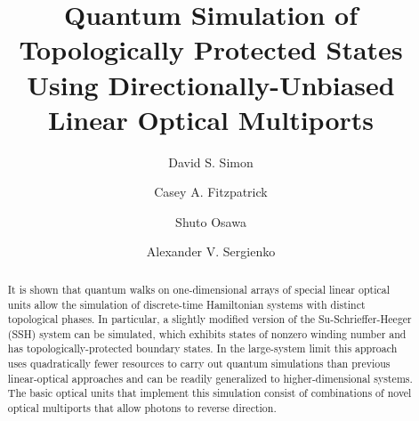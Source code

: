 \documentclass[twocolumn,amsmath, amssymb, superscriptaddress, pra]{revtex4}
\begin{document}



\author{David S. Simon}
  
\author{Casey A. Fitzpatrick}
 
\author{Shuto Osawa}
 
\author{Alexander V. Sergienko}
  



\begin{abstract}


It is shown that quantum walks on one-dimensional arrays of special linear
optical units allow the simulation of discrete-time Hamiltonian systems
with distinct topological phases. In particular, a slightly modified
version of the Su-Schrieffer-Heeger (SSH) system can be simulated, which
exhibits states of nonzero winding number and has topologically-protected
boundary states. In the large-system limit this  approach uses
quadratically fewer resources to carry out quantum simulations than
previous linear-optical approaches and can be readily generalized to
higher-dimensional systems. The basic optical units that implement this
simulation consist of combinations of novel optical multiports that allow
photons to reverse direction.
\end{abstract}


\title{Quantum Simulation of Topologically Protected States Using Directionally-Unbiased Linear Optical Multiports}
\maketitle
\end{document}
